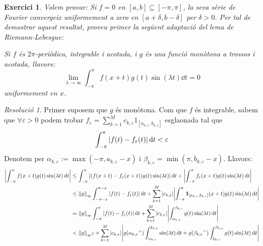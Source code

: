 \documentclass[10pt,a4paper]{article}
\newcommand{\vf}[1]{\boldsymbol{\mathrm{#1}}} %
\newtheorem{exercici}{Exercici}
\theoremstyle{definition}
\theoremstyle{remark}
\newtheorem*{res}{Resolució}
\begin{document}
\begin{exercici}
  Volem provar: Si $f=0$ en $[a,b]\subseteq[-\pi,\pi]$, la seva sèrie de Fourier convergeix uniformement a zero en $[a+\delta,b-\delta]$ per $\delta>0$.
  Per tal de demostrar aquest resultat, proveu primer la següent adaptació del lema de Riemann-Lebesgue:

  Si $f$ és $2\pi$-periòdica, integrable i acotada, i $g$ és una funció monòtona a trossos i acotada, llavors:
  $$\lim_{\lambda\to\infty}\int_{-\pi}^{\pi}f(x+t)g(t)\sin(\lambda t)\dd{t}=0$$
  uniformement en $x$.
\end{exercici}
\begin{res}
  Primer suposem que $g$ és monòtona. Com que $f$ és integrable, sabem que $\forall \varepsilon >0$ podem trobar $f_{\varepsilon}=\sum_{k=1}^Mc_{k,\varepsilon}\vf{1}_{[a_{k,\varepsilon},b_{k,\varepsilon}]}$ esglaonada tal que $$\int_{-\pi}^{\pi}\abs{f(t)-f_{\varepsilon}(t)}\dd{t}<\varepsilon$$ Denotem per $\alpha_{k,\varepsilon}:=\max(-\pi,a_{k,\varepsilon}-x)$ i $\beta_{k,\varepsilon}=\min(\pi,b_{k,\varepsilon}-x)$. Llavors:
  \begin{align*}
    \abs{\int_{-\pi}^{\pi}f(x+t)g(t)\sin(\lambda t)\dd{t}} & \leq \int_{-\pi}^{\pi}\abs{(f(x+t)-f_{\varepsilon}(x+t))g(t)\sin(\lambda t)}\dd{t}+\abs{\int_{-\pi}^{\pi}f_{\varepsilon}(x+t)g(t)\sin(\lambda t)\dd{t}}                                                                                                                             \\
                                                           & \leq \norm{g}_\infty\int_{-\pi-x}^{\pi-x}\abs{f(t)-f_{\varepsilon}(t)}\dd{t}+\sum_{k=1}^M\abs{c_{k,\varepsilon}}\abs{\int_{-\pi}^{\pi}\vf{1}_{[a_{k,\varepsilon},b_{k,\varepsilon}]}(x+t)g(t)\sin(\lambda t)\dd{t}}                                                                 \\
                                                           & = \norm{g}_\infty\int_{-\pi}^{\pi}\abs{f(t)-f_{\varepsilon}(t)}\dd{t}+\sum_{k=1}^M\abs{c_{k,\varepsilon}}\abs{\int_{\alpha_{k,\varepsilon}}^{\beta_{k,\varepsilon}}g(t)\sin(\lambda t)\dd{t}}                                                                                       \\
                                                           & < \norm{g}_\infty\varepsilon+\sum_{k=1}^M\abs{c_{k,\varepsilon}}\abs{g({\alpha_{k,\varepsilon}}^+)\int_{\alpha_{k,\varepsilon}}^{\xi_{k,\varepsilon}}\sin(\lambda t)\dd{t}+g({\beta_{k,\varepsilon}}^-)\int_{\xi_{k,\varepsilon}}^{\beta_{k,\varepsilon}}g(t)\sin(\lambda t)\dd{t}}

\end{align*}
\end{res}
\end{document}
